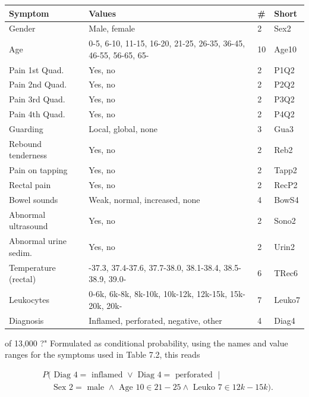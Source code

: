 \documentclass[10pt]{book}
\begin{document}
\begin{center}
\begin{enumerate}
\begin{center}
\begin{tabular}{|l|l|l|l|}
\hline
Symptom & Values & \# & Short \\
\hline
Gender & Male, female & 2 & Sex2 \\
\hline
Age & 0-5, 6-10, 11-15, 16-20, 21-25, 26-35, 36-45, 46-55, 56-65, 65- & 10 & Age10 \\
\hline
Pain 1st Quad. & Yes, no & 2 & P1Q2 \\
\hline
Pain 2nd Quad. & Yes, no & 2 & P2Q2 \\
\hline
Pain 3rd Quad. & Yes, no & 2 & P3Q2 \\
\hline
Pain 4th Quad. & Yes, no & 2 & P4Q2 \\
\hline
Guarding & Local, global, none & 3 & Gua3 \\
\hline
Rebound tenderness & Yes, no & 2 & Reb2 \\
\hline
Pain on tapping & Yes, no & 2 & Tapp2 \\
\hline
Rectal pain & Yes, no & 2 & RecP2 \\
\hline
Bowel sounds & Weak, normal, increased, none & 4 & BowS4 \\
\hline
Abnormal ultrasound & Yes, no & 2 & Sono2 \\
\hline
Abnormal urine sedim. & Yes, no & 2 & Urin2 \\
\hline
Temperature (rectal) & -37.3, 37.4-37.6, 37.7-38.0, 38.1-38.4, 38.5-38.9, 39.0- & 6 & TRec6 \\
\hline
Leukocytes & 0-6k, 6k-8k, 8k-10k, 10k-12k, 12k-15k, 15k-20k, 20k- & 7 & Leuko7 \\
\hline
Diagnosis & Inflamed, perforated, negative, other & 4 & Diag4 \\
\hline
\end{tabular}
\end{center}

of 13,000 ?" Formulated as conditional probability, using the names and value ranges for the symptoms used in Table 7.2, this reads

$$
\begin{aligned}
& P(\text { Diag } 4=\text { inflamed } \vee \text { Diag } 4=\text { perforated } \mid \\
& \quad \text { Sex } 2=\text { male } \wedge \text { Age } 10 \in 21-25 \wedge \text { Leuko } 7 \in 12 k-15 k) .
\end{aligned}
$$


\end{enumerate}
\end{center}
\end{document}

